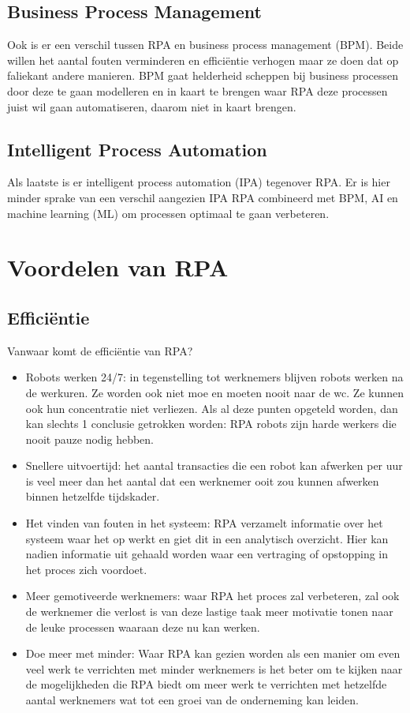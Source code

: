 \subsection{Business Process Management}
Ook is er een verschil tussen RPA en business process management (BPM). Beide willen het aantal fouten verminderen en efficiëntie verhogen maar ze doen dat op faliekant andere manieren. BPM gaat helderheid scheppen bij business processen door deze te gaan modelleren en in kaart te brengen waar RPA deze processen juist wil gaan automatiseren, daarom niet in kaart brengen. \autocite{everythingRPA}

\subsection{Intelligent Process Automation}
Als laatste is er intelligent process automation (IPA) tegenover RPA. Er is hier minder sprake van een verschil aangezien IPA RPA combineerd met BPM, AI en machine learning (ML) om processen optimaal te gaan verbeteren. \autocite{everythingRPA}

\section{Voordelen van RPA}

\subsection{Efficiëntie}
Vanwaar komt de efficiëntie van RPA?
\begin{itemize}
	\item Robots werken 24/7: in tegenstelling tot werknemers blijven robots werken na de werkuren. Ze worden ook niet moe en moeten nooit naar de wc. Ze kunnen ook hun concentratie niet verliezen. Als al deze punten opgeteld worden, dan kan slechts 1 conclusie getrokken worden: RPA robots zijn harde werkers die nooit pauze nodig hebben.
	\item Snellere uitvoertijd: het aantal transacties die een robot kan afwerken per uur is veel meer dan het aantal dat een werknemer ooit zou kunnen afwerken binnen hetzelfde tijdskader.
	\item Het vinden van fouten in het systeem: RPA verzamelt informatie over het systeem waar het op werkt en giet dit in een analytisch overzicht. Hier kan nadien informatie uit gehaald worden waar een vertraging of opstopping in het proces zich voordoet.
	\item Meer gemotiveerde werknemers: waar RPA het proces zal verbeteren, zal ook de werknemer die verlost is van deze lastige taak meer motivatie tonen naar de leuke processen waaraan deze nu kan werken.
	\item Doe meer met minder: Waar RPA kan gezien worden als een manier om even veel werk te verrichten met minder werknemers is het beter om te kijken naar de mogelijkheden die RPA biedt om meer werk te verrichten met hetzelfde aantal werknemers wat tot een groei van de onderneming kan leiden.
\end{itemize}

